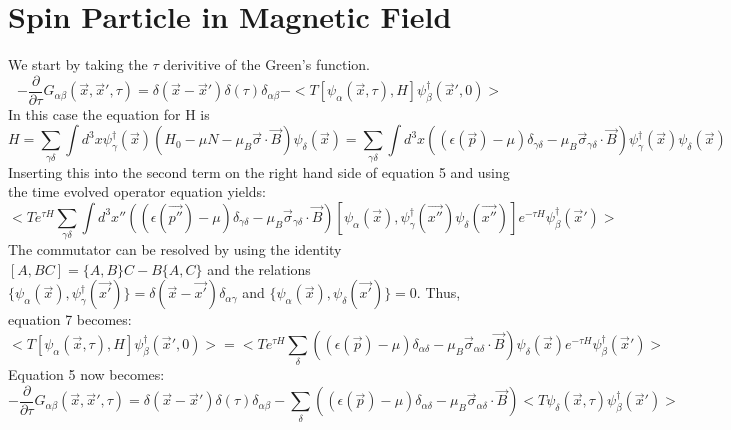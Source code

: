 \documentclass{article}
\begin{document}
\section*{\bf{Spin Particle in Magnetic Field}}
We start by taking the $\tau$ derivitive of the Green's function.
\begin{equation}
-\frac{\partial}{\partial\tau}G_{\alpha\beta}(\vec{x},\vec{x}',\tau)=\delta(\vec{x}-\vec{x}')\delta(\tau)\delta_{\alpha\beta}-<T[\psi_\alpha(\vec{x},\tau),H] \psi^\dagger_\beta(\vec{x}',0)>
\end{equation}
In this case the equation for H is 
\begin{equation}
H=\sum\limits_{\gamma\delta}\int d^3x \psi^\dagger_\gamma(\vec{x})(H_0-\mu N-\mu_B \vec{\sigma} \cdot \vec{B})\psi_\delta(\vec{x})=\sum\limits_{\gamma\delta}\int d^3x((\epsilon(\vec{p})-\mu)\delta_{\gamma\delta}-\mu_B \vec{\sigma}_{\gamma\delta} \cdot \vec{B})\psi^\dagger_\gamma(\vec{x})\psi_\delta(\vec{x})
\end{equation}
Inserting this into the second term on the right hand side of equation 5 and using the time evolved operator equation yields:
\begin{equation}
<Te^{\tau H}\sum\limits_{\gamma\delta}\int d^3x'' ((\epsilon(\vec{p''})-\mu)\delta_{\gamma\delta}-\mu_B \vec{\sigma}_{\gamma\delta} \cdot \vec{B}) [\psi_\alpha(\vec{x}),\psi^\dagger_\gamma(\vec{x''})\psi_\delta(\vec{x''})]e^{-\tau H}\psi^\dagger_\beta(\vec{x}')>
\end{equation}
The commutator can be resolved by using the identity $[A,BC]=\{A,B\}C-B\{A,C\}$ and the relations $\{\psi_\alpha(\vec{x}),\psi^\dagger_\gamma(\vec{x'})\}=\delta(\vec{x}-\vec{x'})\delta_{\alpha\gamma}$ and $\{\psi_\alpha(\vec{x}),\psi_\delta(\vec{x'})\}=0$. Thus, equation 7 becomes:
\begin{equation}
<T[\psi_\alpha(\vec{x},\tau),H] \psi^\dagger_\beta(\vec{x}',0)>=<Te^{\tau H}\sum\limits_{\delta} ((\epsilon(\vec{p})-\mu)\delta_{\alpha\delta}-\mu_B \vec{\sigma}_{\alpha\delta} \cdot \vec{B})\psi_\delta(\vec{x})e^{-\tau H}\psi^\dagger_\beta(\vec{x}')>
\end{equation}
Equation 5 now becomes:
\begin{equation}
-\frac{\partial}{\partial\tau}G_{\alpha\beta}(\vec{x},\vec{x}',\tau)=\delta(\vec{x}-\vec{x}')\delta(\tau)\delta_{\alpha\beta}-\sum\limits_{\delta} ((\epsilon(\vec{p})-\mu)\delta_{\alpha\delta}-\mu_B \vec{\sigma}_{\alpha\delta} \cdot \vec{B})<T\psi_\delta(\vec{x},\tau)\psi^\dagger_\beta(\vec{x}')>
\end{equation}
\end{document}
